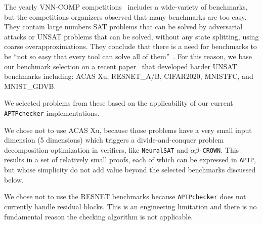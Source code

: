 \documentclass[oneside,11pt,dvipsnames]{book}
\newcommand{\nnproofchecker}{\texttt{APTPchecker}}
\newcommand{\nnproofformat}{\texttt{APTP}}
\newcommand{\crown}{\texttt{$\alpha\beta$-CROWN}}
\newcommand{\neuralsat}{\texttt{NeuralSAT}}
\begin{document}
The yearly VNN-COMP competitions~\cite{brix2023first,brix2023fourth,bak2021second} includes a wide-variety of benchmarks,
but the competitions organizers observed that many benchmarks are too easy.
They contain large numbers SAT problems that can be solved by adversarial attacks 
or UNSAT problems that can be solved, without any state splitting, using coarse overapproximations.
They conclude that there is a need 
for benchmarks to be ``not so easy that every tool can solve all of them''~\cite{brix2023first}.
For this reason, we base our benchmark selection on a recent paper~\cite{duong2024harnessing} that developed harder
UNSAT benchmarks including:
ACAS Xu, RESNET\_A/B, CIFAR2020, MNISTFC, and MNIST\_GDVB.

We selected problems from these based on the applicability of our
current \nnproofchecker{} implementations.

We chose not to use ACAS Xu, because those problems have a very small
input dimension (5 dimensions) which triggers a divide-and-conquer problem
decomposition optimization in verifiers, like \neuralsat{} and \crown{}.
This results in a set of relatively small proofs, each of which
can be expressed in \nnproofformat{}, but whose simplicity do not add
value beyond the selected benchmarks discussed below.

We chose not to use the RESNET benchmarks because  \nnproofchecker{} does not currently handle residual blocks.  This is an engineering limitation and there is no fundamental reason the checking algorithm is not applicable.  
\end{document}
